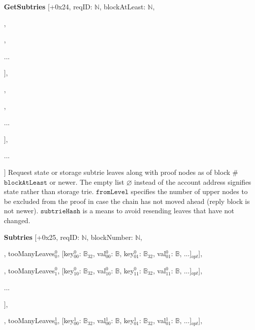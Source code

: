 \documentclass{amsart}
\begin{document}
\textbf{GetSubtries} [+0x24, reqID: $\mathbb{N}$, blockAtLeast: $\mathbb{N}$,

\quad [account$^0$: $\mathbb{B}_{20} | \varnothing$,

\qquad [prefix$^0_0$: $\mathbb{Y}$, fromLevel$^0_0$: $\mathbb{N}$, subtrieHash$^0_0$: $\mathbb{B}_{32}| \varnothing$],

,

\qquad ...

\quad ],

\quad [account$^1$: $\mathbb{B}_{20} | \varnothing$,

\qquad [prefix$^1_0$: $\mathbb{Y}$, fromLevel$^1_0$: $\mathbb{N}$, subtrieHash$^1_0$: $\mathbb{B}_{32}| \varnothing$],

,

\qquad ...

\quad ],

\quad ...

] Request state or storage subtrie leaves along with proof nodes as of block \#$\texttt{blockAtLeast}$ or newer.
The empty list $\varnothing$ instead of the account address signifies state rather than storage trie.
$\texttt{fromLevel}$ specifies the number of upper nodes to be excluded from the proof in case the chain has not moved ahead (reply block is not newer).
$\texttt{subtrieHash}$ is a means to avoid resending leaves that have not changed.

\textbf{Subtries} [+0x25, reqID: $\mathbb{N}$,  blockNumber: $\mathbb{N}$,

\quad [

\qquad [[node$^0_{00}$: $\mathbb{B}$, node$^0_{01}$: $\mathbb{B}$, ...], tooManyLeaves$^0_0$, [key$^0_{00}$: $\mathbb{B}_{32}$, val$^0_{00}$: $\mathbb{B}$, key$^0_{01}$: $\mathbb{B}_{32}$, val$^0_{01}$: $\mathbb{B}$, ...]$_{opt}$],

\qquad [[node$^0_{10}$: $\mathbb{B}$, node$^0_{11}$: $\mathbb{B}$, ...], tooManyLeaves$^0_1$, [key$^0_{10}$: $\mathbb{B}_{32}$, val$^0_{10}$: $\mathbb{B}$, key$^0_{11}$: $\mathbb{B}_{32}$, val$^0_{11}$: $\mathbb{B}$, ...]$_{opt}$],

\qquad ...

\quad ],

\quad [

\qquad [[node$^1_{00}$: $\mathbb{B}$, node$^1_{01}$: $\mathbb{B}$, ...], tooManyLeaves$^1_0$, [key$^1_{00}$: $\mathbb{B}_{32}$, val$^1_{00}$: $\mathbb{B}$, key$^1_{01}$: $\mathbb{B}_{32}$, val$^1_{01}$: $\mathbb{B}$, ...]$_{opt}$],
\end{document}
